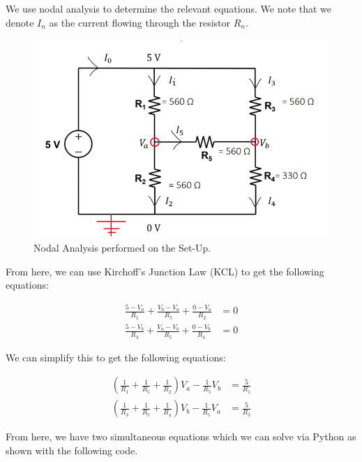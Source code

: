 \documentclass{article}
\begin{document}
We use nodal analysis to determine the relevant equations. We note that we denote $I_n$ as the current flowing through the resistor $R_n$.

\begin{figure}[h!]
    \centering
    \includegraphics[width=\textwidth]{images/nodalAnalysis.png}
    \caption{Nodal Analysis performed on the Set-Up.}
    \label{fig:nodal}
\end{figure}


From here, we can use Kirchoff's Junction Law (KCL) to get the following equations:

\begin{align}
    \frac{5-V_a}{R_1} + \frac{V_b - V_a}{R_5} + \frac{0-V_a}{R_2} &= 0 \\
    \frac{5-V_b}{R_3} + \frac{V_a-V_b}{R_5} + \frac{0-V_b}{R_4} &= 0
\end{align}

We can simplify this to get the following equations:

\begin{align}
    \left(\frac{1}{R_1} + \frac{1}{R_5} + \frac{1}{R_2}\right) V_a - \frac{1}{R_5}V_b &= \frac{5}{R_1} \\
    \left(\frac{1}{R_3} + \frac{1}{R_5} + \frac{1}{R_4}\right) V_b - \frac{1}{R_5}V_a &= \frac{5}{R_3}
\end{align}


From here, we have two simultaneous equations which we can solve via Python as shown with the following code.
\end{document}
